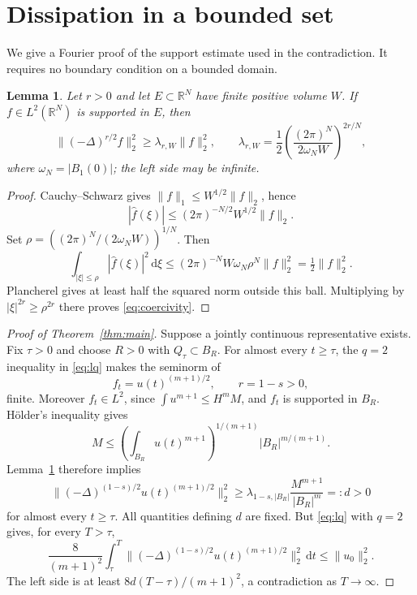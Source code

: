 \documentclass[11pt]{article}
\newtheorem{lemma}[theorem]{Lemma}
\theoremstyle{definition}
\newcommand{\R}{\mathbb R}
\newcommand{\dd}{\,\mathrm d}
\begin{document}
\section{Dissipation in a bounded set}
We give a Fourier proof of the support estimate used in the contradiction. It requires no boundary condition on a bounded domain.

\begin{lemma}\label{lem:coercivity}
Let $r>0$ and let $E\subset\R^N$ have finite positive volume $W$. If $f\in L^2(\R^N)$ is supported in $E$, then
\begin{equation}\label{eq:coercivity}
 \|(-\Delta)^{r/2}f\|_2^2\ge\lambda_{r,W}\|f\|_2^2,
 \qquad
 \lambda_{r,W}=\frac12\left(\frac{(2\pi)^N}{2\omega_NW}\right)^{2r/N},
\end{equation}
where $\omega_N=|B_1(0)|$; the left side may be infinite.
\end{lemma}

\begin{proof}
Cauchy--Schwarz gives $\|f\|_1\le W^{1/2}\|f\|_2$, hence
\[
 |\widehat f(\xi)|\le(2\pi)^{-N/2}W^{1/2}\|f\|_2.
\]
Set $\rho=((2\pi)^N/(2\omega_NW))^{1/N}$. Then
\[
 \int_{|\xi|\le\rho}|\widehat f(\xi)|^2\dd\xi
 \le(2\pi)^{-N}W\omega_N\rho^N\|f\|_2^2
 =\tfrac12\|f\|_2^2.
\]
Plancherel gives at least half the squared norm outside this ball. Multiplying by $|\xi|^{2r}\ge\rho^{2r}$ there proves \eqref{eq:coercivity}.
\end{proof}

\begin{proof}[Proof of Theorem~\ref{thm:main}]
Suppose a jointly continuous representative exists. Fix $\tau>0$ and choose $R>0$ with $Q_\tau\subset B_R$. For almost every $t\ge\tau$, the $q=2$ inequality in \eqref{eq:lq} makes the seminorm of
\[
 f_t=u(t)^{(m+1)/2},\qquad r=1-s>0,
\]
finite. Moreover $f_t\in L^2$, since $\int u^{m+1}\le H^mM$, and $f_t$ is supported in $B_R$. H\"older's inequality gives
\[
 M\le\left(\int_{B_R}u(t)^{m+1}\right)^{1/(m+1)}|B_R|^{m/(m+1)}.
\]
Lemma~\ref{lem:coercivity} therefore implies
\begin{equation}\label{eq:positive-dissipation}
 \bigl\|(-\Delta)^{(1-s)/2}u(t)^{(m+1)/2}\bigr\|_2^2
 \ge\lambda_{1-s,|B_R|}\frac{M^{m+1}}{|B_R|^m}=:d>0
\end{equation}
for almost every $t\ge\tau$. All quantities defining $d$ are fixed. But \eqref{eq:lq} with $q=2$ gives, for every $T>\tau$,
\[
 \frac8{(m+1)^2}\int_\tau^T
 \bigl\|(-\Delta)^{(1-s)/2}u(t)^{(m+1)/2}\bigr\|_2^2\dd t
 \le\|u_0\|_2^2.
\]
The left side is at least $8d(T-\tau)/(m+1)^2$, a contradiction as $T\to\infty$.
\end{proof}
\end{document}
